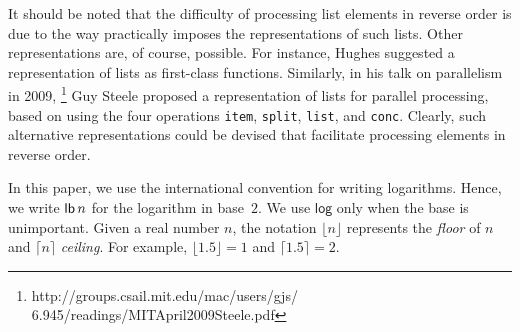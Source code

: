 It should be noted that the difficulty of processing list elements in
reverse order is due to the way \commonlisp{} practically imposes the
representations of such lists.  Other representations are, of course,
possible.  For instance, Hughes \cite{Hughes:1986} suggested a
representation of lists as first-class functions.  Similarly, in his
talk on parallelism in 2009,%
\footnote{http://groups.csail.mit.edu/mac/users/gjs/\\
6.945/readings/MITApril2009Steele.pdf}
Guy Steele proposed a representation of lists for parallel processing,
based on using the four operations \texttt{item}, \texttt{split},
\texttt{list}, and \texttt{conc}.  Clearly, such alternative
representations could be devised that facilitate processing elements
in reverse order.

In this paper, we use the international convention \cite{ISO80000} for
writing logarithms.  Hence, we write $\mathsf{lb}\thinspace n$ for the
logarithm in base~$2$.  We use $\mathsf{log}$ only when the base is
unimportant.
Given a real number $n$, the notation
$\lfloor n \rfloor$ represents the \emph{floor} of $n$ 
and $\lceil n \rceil$ \emph{ceiling}. For example, $\lfloor 1.5 \rfloor = 1$
and $\lceil 1.5 \rceil = 2$. 
